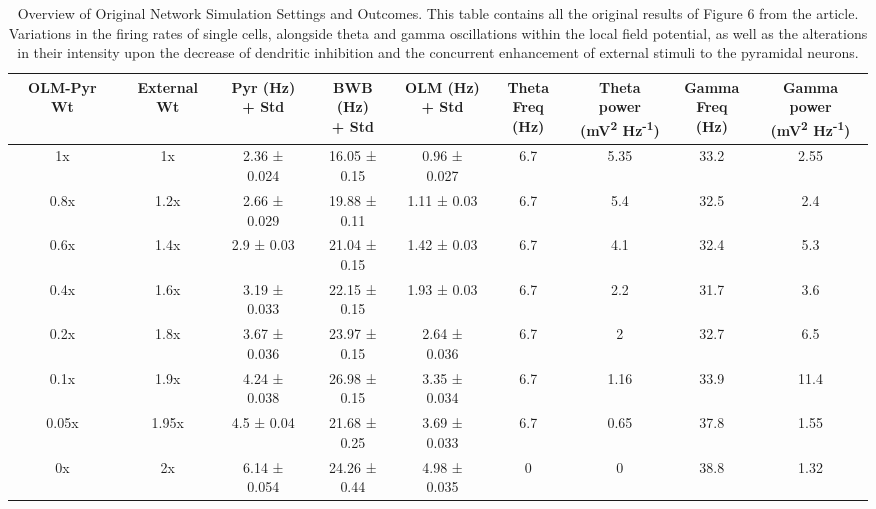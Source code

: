 \begin{table}[htbp]
    \centering
    \caption[Summary of Original Network Simulation Parameters and Results]{Overview of Original Network Simulation Settings and Outcomes.
        This table contains all the original results of Figure 6 from the \textcite{sanjayImpairedDendriticInhibition2015} article.
        Variations in the firing rates of single cells, alongside theta and gamma oscillations within the local field potential, as well as the alterations in their intensity upon the decrease of dendritic inhibition and the concurrent enhancement of external stimuli to the pyramidal neurons.}\label{tab:original_validation_results}
    \begin{adjustbox}{width=\textwidth}
        \begin{tabular}{ccccccccc}
            \hline
            OLM-Pyr Wt & External Wt & \CellWithForcedBreak{Pyr (Hz)                                                          \\ + Std} & \CellWithForcedBreak{BWB (Hz) \\ + Std} & \CellWithForcedBreak{OLM (Hz) \\ + Std} & \CellWithForcedBreak{Theta \\ Freq (Hz)} & \CellWithForcedBreak{Theta power \\ (mV\textsuperscript{2} Hz\textsuperscript{-1})} & \CellWithForcedBreak{Gamma \\ Freq (Hz)} & \CellWithForcedBreak{Gamma power \\ (mV\textsuperscript{2} Hz\textsuperscript{-1})} \\
            \hline
            1x         & 1x          & 2.36 ± 0.024                  & 16.05 ± 0.15 & 0.96 ± 0.027 & 6.7 & 5.35 & 33.2 & 2.55 \\
            0.8x       & 1.2x        & 2.66 ± 0.029                  & 19.88 ± 0.11 & 1.11 ± 0.03  & 6.7 & 5.4  & 32.5 & 2.4  \\
            0.6x       & 1.4x        & 2.9 ± 0.03                    & 21.04 ± 0.15 & 1.42 ± 0.03  & 6.7 & 4.1  & 32.4 & 5.3  \\
            0.4x       & 1.6x        & 3.19 ± 0.033                  & 22.15 ± 0.15 & 1.93 ± 0.03  & 6.7 & 2.2  & 31.7 & 3.6  \\
            0.2x       & 1.8x        & 3.67 ± 0.036                  & 23.97 ± 0.15 & 2.64 ± 0.036 & 6.7 & 2    & 32.7 & 6.5  \\
            0.1x       & 1.9x        & 4.24 ± 0.038                  & 26.98 ± 0.15 & 3.35 ± 0.034 & 6.7 & 1.16 & 33.9 & 11.4 \\
            0.05x      & 1.95x       & 4.5 ± 0.04                    & 21.68 ± 0.25 & 3.69 ± 0.033 & 6.7 & 0.65 & 37.8 & 1.55 \\
            0x         & 2x          & 6.14 ± 0.054                  & 24.26 ± 0.44 & 4.98 ± 0.035 & 0   & 0    & 38.8 & 1.32 \\
            \hline
        \end{tabular}
    \end{adjustbox}
\end{table}

